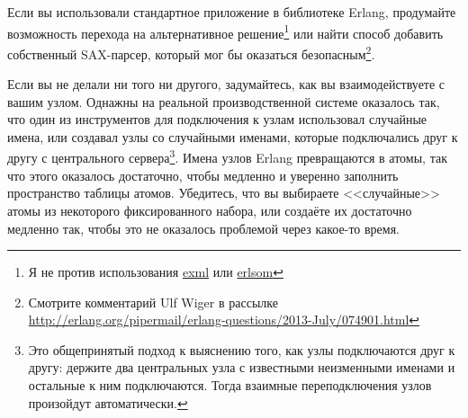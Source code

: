 \documentclass[11pt, oneside]{book}   	%
\begin{document}
Если вы использовали стандартное приложение  в библиотеке Erlang, продумайте возможность перехода на альтернативное решение\footnote{Я не против использования \href{https://github.com/paulgray/exml}{exml} или \href{https://github.com/willemdj/erlsom}{erlsom}} или найти способ добавить собственный SAX-парсер, который мог бы оказаться безопасным\footnote{Смотрите комментарий Ulf Wiger в рассылке \href{http://erlang.org/pipermail/erlang-questions/2013-July/074901.html}{http://erlang.org/pipermail/erlang-questions/2013-July/074901.html}}.

Если вы не делали ни того ни другого, задумайтесь, как вы взаимодействуете с вашим узлом. Однажны на реальной производственной системе оказалось так, что один из инструментов для подключения к узлам использовал случайные имена, или создавал узлы со случайными именами, которые подключались друг к другу с центрального сервера\footnote{Это общепринятый подход к выяснению того, как узлы подключаются друг к другу: держите два центральных узла с известными неизменными именами и остальные к ним подключаются. Тогда взаимные переподключения узлов произойдут автоматически.}. Имена узлов Erlang превращаются в атомы, так что этого оказалось достаточно, чтобы медленно и уверенно заполнить пространство таблицы атомов. Убедитесь, что вы выбираете <<случайные>> атомы из некоторого фиксированного набора, или создаёте их достаточно медленно так, чтобы это не оказалось проблемой через какое-то время.
\end{document}
